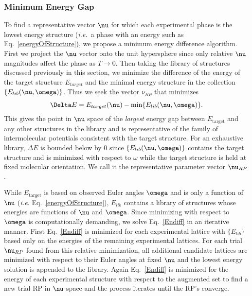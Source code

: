 \documentclass[preprint]{iucr}              %
\newcommand{\mb}[1]{\ensuremath{\mbox{\boldmath $ #1 $}}}
\begin{document}
\subsubsection{Minimum Energy Gap}
\label{Minimum_Energy_Gap}

To find a representative vector $\mb{\nu}$ for which each
experimental phase is the lowest energy structure (\emph{i.e.}\ a
phase with an energy such as Eq.\ \ref{energyOfStructure}), we
propose a minimum energy difference algorithm. First we project the
$\mb{\nu}$ vector onto the unit hypersphere since only relative
$\mb{\nu}$ magnitudes affect the phase as $T\rightarrow 0$. Then
taking the library of structures discussed previously in this
section, we minimize the difference of the energy of the target
structure $E_{target}$ and the minimal energy structure in the
collection $\{E_{lib}(\mb{\nu},\mb{\omega})\}$.  Thus we seek the
vector $\nu_{RP}$ that minimizes
\begin{equation}
\label{Endiff} \Delta E =
E_{target}(\mb{\nu})-\min\{E_{lib}(\mb{\nu},\mb{\omega})\}.
\end{equation}
This gives the point in $\mb{\nu}$ space of the \emph{largest}
energy gap between $E_{\mathrm{target}}$ and any other structures in
the library and is representative of the family of intermolecular
potentials consistent with the target structure. For an exhaustive
library, $\Delta E$ is bounded below by 0 since
$\{E_{lib}(\mb{\nu},\mb{\omega})\}$ contains the target structure
and is minimized with respect to $\omega$ while the target structure
is held at fixed molecular orientation. We call it the
representative parameter vector $\mb{\nu}_{RP}$.

While $E_{\mathrm{target}}$ is based on observed Euler angles
$\mb{\omega}$ and is only a function of $\mb{\nu}$ (\emph{i.e.} Eq.\
\ref{energyOfStructure}), $E_{lib}$ contains a library of structures
whose energies are functions of $\mb{\nu}$ and $\mb{\omega}$. Since
minimizing with respect to $\mb{\omega}$ is computationally
demanding, we solve Eq.~\ref{Endiff} in an iterative manner. First
Eq.~\ref{Endiff} is minimized for each experimental lattice with
$\{E_{lib}\}$ based only on the energies of the remaining
experimental lattices. For each trial $\mb{\nu}_{RP}$ found from
this relative minimization, all additional candidate lattices are
minimized with respect to their Euler angles at fixed $\mb{\nu}$ and
the lowest energy solution is appended to the library. Again
Eq.~\ref{Endiff} is minimized for the energy of each experimental
structure with respect to the augmented set to find a new trial RP
in $\mb{\nu}$-space and the process iterates until the RP's
converge.
\end{document}

